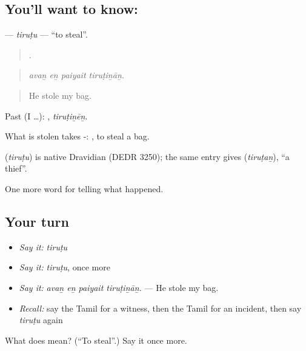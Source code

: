 \subsection*{You'll want to know: }
\textbf{} — \emph{tiruṭu} — \textquotedblleft{}to steal\textquotedblright{}.

\begin{quote}
   .
\end{quote}

\begin{quote}
\emph{avaṉ eṉ paiyait tiruṭiṉāṉ.}
\end{quote}

\begin{quote}
He stole my bag.
\end{quote}

Past (I …): , \emph{tiruṭiṉēṉ}.

What is stolen takes -:  , to steal a bag.

\begin{cousinweb}
\textbf{} (\emph{tiruṭu}) is native Dravidian (DEDR 3250); the same entry gives  (\emph{tiruṭaṉ}), \textquotedblleft{}a thief\textquotedblright{}.
\end{cousinweb}

\begin{grammarlens}[title={What you've built}]
One more word for telling what happened.
\end{grammarlens}

\subsection*{Your turn}
\begin{itemize}
\raggedright
  \item \emph{Say it:} \emph{tiruṭu}
  \item \emph{Say it:} \emph{tiruṭu}, once more
  \item \emph{Say it:} \emph{avaṉ eṉ paiyait tiruṭiṉāṉ.} — He stole my bag.
  \item \emph{Recall:} say the Tamil for a witness, then the Tamil for an incident, then say \emph{tiruṭu} again
\end{itemize}

\begin{tcolorbox}[breakable,colback=teal!4,colframe=teal!35!black,title={Before you move on}]
What does  mean? (\textquotedblleft{}To steal\textquotedblright{}.) Say it once more.
\end{tcolorbox}
